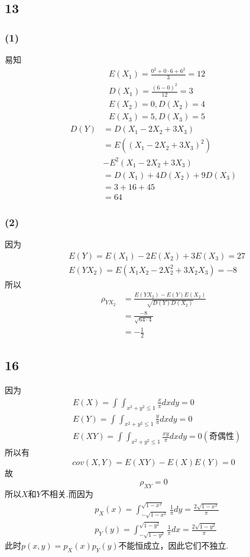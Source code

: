\documentclass[twocolumn]{article}
\begin{document}
\begin{CJK}{UTF8}{gbsn}
			\subsection*{13}
			\subsubsection*{(1)}
				易知\begin{align*}
					& E(X_1)=\frac{0^2+0\cdot6+6^2}{3}=12\\
					& D(X_1)=\frac{(6-0)^2}{12}=3\\
					& E(X_2)=0, D(X_2)=4\\
					& E(X_3)=5, D(X_3)=5
				\end{align*}
				\begin{align*}
					D(Y) & = D(X_1-2X_2+3X_3)\\
					& = E((X_1-2X_2+3X_3)^2)\\
					& - E^2(X_1-2X_2+3X_3)\\
					& = D(X_1)+4D(X_2)+9D(X_3)\\
					& = 3+16+45\\
					& = 64
				\end{align*}
			\subsubsection*{(2)}
				因为\begin{align*}
					& E(Y)=E(X_1)-2E(X_2)+3E(X_3)=27\\
					& E(YX_2)=E(X_1X_2-2X_2^2+3X_2X_3)=-8
				\end{align*}
				所以\begin{align*}
					\rho_{YX_2} & = \frac{E(YX_2)-E(Y)E(X_2)}{\sqrt{D(Y)D(X_2)}}\\
					& = \frac{-8}{\sqrt{64\cdot4}}\\
					& = -\frac{1}{2}
				\end{align*}
			\subsection*{16}
				因为
				\begin{align*}
					& E(X) = \int_{}^{}\int_{x^2+y^2\le1}^{}\frac{x}{\pi}dxdy = 0\\
					& E(Y) = \int_{}^{}\int_{x^2+y^2\le1}^{}\frac{y}{\pi}dxdy = 0\\
					& E(XY) = \int_{}^{}\int_{x^2+y^2\le1}^{}\frac{xy}{\pi}dxdy = 0(\textrm{奇偶性})
				\end{align*}
				所以有\[cov(X,Y)=E(XY)-E(X)E(Y)=0\]故\[\rho_{XY}=0\]所以$X$和$Y$不相关.而因为\begin{align*}
				    & p_X(x)=\int_{-\sqrt{1-x^2}}^{\sqrt{1-x^2}}\frac{1}{\pi}dy=\frac{2\sqrt{1-x^2}}{\pi}\\
				    & p_Y(y)=\int_{-\sqrt{1-y^2}}^{\sqrt{1-y^2}}\frac{1}{\pi}dx=\frac{2\sqrt{1-y^2}}{\pi}
				\end{align*}	
				此时$p(x,y)=p_X(x)p_Y(y)$不能恒成立，因此它们不独立.	
	\end{CJK}
\end{document}
